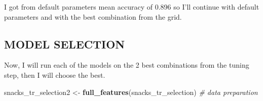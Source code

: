 \documentclass[
]{article}
\newenvironment{Shaded}{\begin{snugshade}}{\end{snugshade}}
\newcommand{\CommentTok}[1]{\textcolor[rgb]{0.56,0.35,0.01}{\textit{#1}}}
\newcommand{\KeywordTok}[1]{\textcolor[rgb]{0.13,0.29,0.53}{\textbf{#1}}}
\newcommand{\NormalTok}[1]{#1}
\newcommand{\StringTok}[1]{\textcolor[rgb]{0.31,0.60,0.02}{#1}}
\begin{document}
I got from default parameters mean accuracy of 0.896 so I'll continue
with default parameters and with the best combination from the grid.

\hypertarget{model-selection}{%
\subsection{MODEL SELECTION}\label{model-selection}}

Now, I will run each of the models on the 2 best combinations from the
tuning step, then I will choose the best.

\begin{Shaded}
\begin{Highlighting}[]
\NormalTok{snacks_tr_selection2 <-}\StringTok{ }\KeywordTok{full_features}\NormalTok{(snacks_tr_selection) }\CommentTok{# data preparation}
\end{Highlighting}
\end{Shaded}
\end{document}
